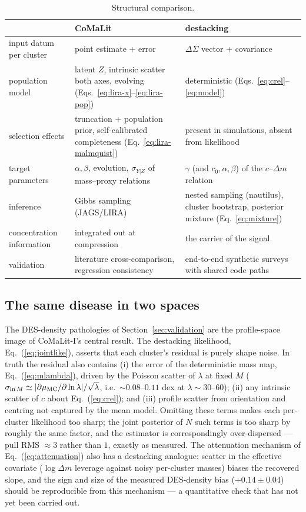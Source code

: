 \documentclass[11pt,a4paper]{article}
\newcommand{\DSigma}{\Delta\Sigma}
\begin{document}
\begin{table}
\centering
\caption{Structural comparison.}
\label{tab:compare}
\begin{tabular}{p{4.0cm}p{5.1cm}p{5.1cm}}
\toprule
 & CoMaLit & destacking\\
\midrule
input datum per cluster & point estimate + error & $\DSigma$ vector + covariance\\
population model & latent $Z$, intrinsic scatter both axes, evolving (Eqs.~\ref{eq:lira-x}--\ref{eq:lira-pop}) & deterministic (Eqs.~\ref{eq:crel}--\ref{eq:model})\\
selection effects & truncation + population prior, self-calibrated completeness (Eq.~\ref{eq:lira-malmquist}) & present in simulations, absent from likelihood\\
target parameters & $\alpha, \beta$, evolution, $\sigma_{Y|Z}$ of mass--proxy relations & $\gamma$ (and $c_0,\alpha,\beta$) of the $c$--$\Delta m$ relation\\
inference & Gibbs sampling (JAGS/LIRA) & nested sampling (nautilus), cluster bootstrap, posterior mixture (Eq.~\ref{eq:mixture})\\
concentration information & integrated out at compression & the carrier of the signal\\
validation & literature cross-comparison, regression consistency & end-to-end synthetic surveys with shared code paths\\
\bottomrule
\end{tabular}
\end{table}

\subsection{The same disease in two spaces}

The DES-density pathologies of Section~\ref{sec:validation} are the
profile-space image of CoMaLit-I's central result. The destacking
likelihood, Eq.~(\ref{eq:jointlike}), asserts that each cluster's residual
is purely shape noise. In truth the residual also contains (i) the error of
the deterministic mass map, Eq.~(\ref{eq:mlambda}), driven by the Poisson
scatter of $\lambda$ at fixed $M$
($\sigma_{\ln M} \simeq |\partial \mu_{\rm MC}/\partial\ln\lambda| /
\sqrt{\lambda}$, i.e.\ $\sim 0.08$--$0.11$ dex at
$\lambda \sim 30$--$60$); (ii) any intrinsic scatter of $c$ about
Eq.~(\ref{eq:crel}); and (iii) profile scatter from orientation and
centring not captured by the mean model. Omitting these terms makes each
per-cluster likelihood too sharp; the joint posterior of $N$ such terms is
too sharp by roughly the same factor, and the estimator is correspondingly
over-dispersed --- pull RMS $\approx 3$ rather than $1$, exactly as
measured. The attenuation mechanism of Eq.~(\ref{eq:attenuation}) also has
a destacking analogue: scatter in the effective covariate
($\log \Delta m$ leverage against noisy per-cluster masses) biases the
recovered slope, and the sign and size of the measured DES-density bias
($+0.14\pm0.04$) should be reproducible from this mechanism --- a
quantitative check that has not yet been carried out.
\end{document}
